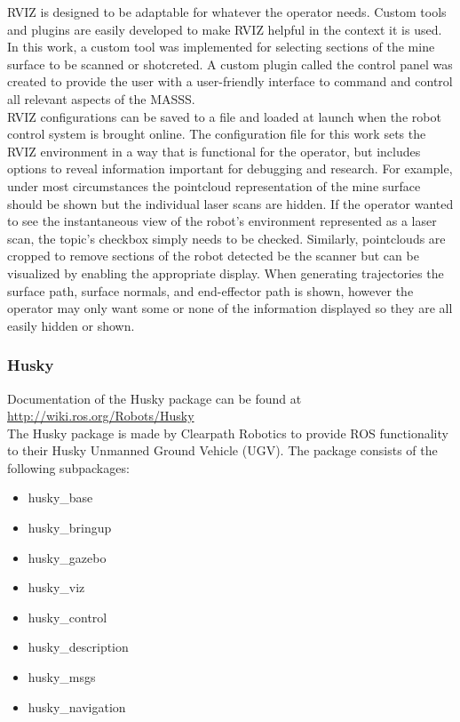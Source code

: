 RVIZ is designed to be adaptable for whatever the operator needs. Custom tools and plugins are easily developed to make RVIZ helpful in the context it is used. In this work, a custom tool was implemented for selecting sections of the mine surface to be scanned or shotcreted. A custom plugin called the control panel was created to provide the user with a user-friendly interface to command and control all relevant aspects of the MASSS.\\

RVIZ configurations can be saved to a file and loaded at launch when the robot control system is brought online. The configuration file for this work sets the RVIZ environment in a way that is functional for the operator, but includes options to reveal information important for debugging and research. For example, under most circumstances the pointcloud representation of the mine surface should be shown but the individual laser scans are hidden. If the operator wanted to see the instantaneous view of the robot's environment represented as a laser scan, the topic's checkbox simply needs to be checked. Similarly, pointclouds are cropped to remove sections of the robot detected be the scanner but can be visualized by enabling the appropriate display. When generating trajectories the surface path, surface normals, and end-effector path is shown, however the operator may only want some or none of the information displayed so they are all easily hidden or shown.\\

\subsubsection{Husky}

Documentation of the Husky package can be found at \url{http://wiki.ros.org/Robots/Husky}\\

The Husky package is made by Clearpath Robotics to provide ROS functionality to their Husky Unmanned Ground Vehicle (UGV). The package consists of the following subpackages:

\begin{itemize}
    \item husky\_base
    \item husky\_bringup
    \item husky\_gazebo
    \item husky\_viz
    \item husky\_control
    \item husky\_description
    \item husky\_msgs
    \item husky\_navigation
\end{itemize}

